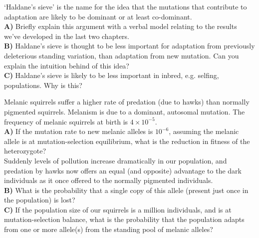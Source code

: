 {\begin{question}
`Haldane's sieve' is the name for the idea that the mutations that contribute to adaptation are likely to be dominant or at least co-dominant. \\
{\bf A)} Briefly explain this argument with a verbal model relating to the
results we've developed in the last two chapters. \\
{\bf B)} Haldane's sieve is thought to be less important for adaptation from previously deleterious standing variation, than adaptation from new mutation. Can you explain the intuition behind of this idea?\\
{\bf C)} Haldane's sieve is likely to be less important in inbred,
e.g. selfing, populations. Why is this? \\

\end{question}

\begin{question}
Melanic squirrels suffer a higher rate of predation (due to hawks) than normally pigmented squirrels. Melanism is due to a dominant, autosomal mutation. The frequency of melanic squirrels at birth is $4 \times 10^{-5}$.\\

{\bf A)} If the mutation rate to new melanic alleles is $10^{-6}$, assuming the melanic allele is at mutation-selection equilibrium, what
is the reduction in fitness of the heterozygote? \\ 
Suddenly levels of pollution increase dramatically in our population,
and predation by hawks now offers an equal (and opposite) advantage to
the dark individuals as it once offered to the normally pigmented
individuals. \\
{\bf B)} What is the probability that a single copy of this allele
(present just once in the population) is lost?\\ 
{\bf C)}  If the population size of our squirrels is a million
individuals, and is at mutation-selection balance, what is the probability that the population adapts from one or more allele(s) from the standing pool of melanic alleles?  
\end{question}


}
